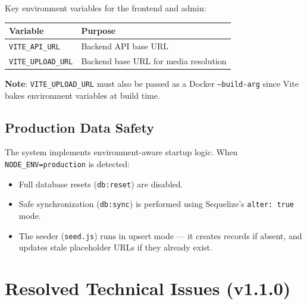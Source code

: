 \documentclass[12pt,a4paper]{article}
\begin{document}
\noindent Key environment variables for the frontend and admin:

\begin{center}
\begin{tabular}{ll}
\toprule
Variable & Purpose \\
\midrule
\texttt{VITE\_API\_URL} & Backend API base URL \\
\texttt{VITE\_UPLOAD\_URL} & Backend base URL for media resolution \\
\bottomrule
\end{tabular}
\end{center}

\textbf{Note}: \texttt{VITE\_UPLOAD\_URL} must also be passed as a Docker \texttt{--build-arg} since Vite bakes environment variables at build time.

\subsection{Production Data Safety}
The system implements environment-aware startup logic. When \texttt{NODE\_ENV=production} is detected:
\begin{itemize}
    \item Full database resets (\texttt{db:reset}) are disabled.
    \item Safe synchronization (\texttt{db:sync}) is performed using Sequelize's \texttt{alter: true} mode.
    \item The seeder (\texttt{seed.js}) runs in upsert mode --- it creates records if absent, and updates stale placeholder URLs if they already exist.
\end{itemize}

\section{Resolved Technical Issues (v1.1.0)}
\end{document}
